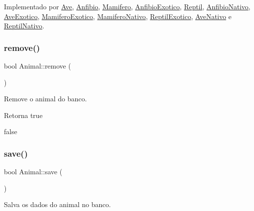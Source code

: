 Implementado por \hyperlink{classAve_a41d6ba4bf7e4823274211a9ae908ff1f}{Ave}, \hyperlink{classAnfibio_a46f3f30c89af05bcdd39abbe692d854f}{Anfibio}, \hyperlink{classMamifero_a88e6c2efe9180611486f82d4dbf308ba}{Mamifero}, \hyperlink{classAnfibioExotico_a08d9debec54258a0f43c8c503dfb23d0}{Anfibio\+Exotico}, \hyperlink{classReptil_af0fc1ff345f15480da9830e38111d181}{Reptil}, \hyperlink{classAnfibioNativo_a7926e1af44542ee268e27dd3d862f583}{Anfibio\+Nativo}, \hyperlink{classAveExotico_a4ba81def12131f047b3800e5f10a983b}{Ave\+Exotico}, \hyperlink{classMamiferoExotico_a4ee6f5f4a2917cfdf54304525add0c4a}{Mamifero\+Exotico}, \hyperlink{classMamiferoNativo_ae2f2b00cb6720cea2780ebef78be52ea}{Mamifero\+Nativo}, \hyperlink{classReptilExotico_a71312f425b92e04d8f29a856abd83f26}{Reptil\+Exotico}, \hyperlink{classAveNativo_ab95679ed20354b2183706db24899d316}{Ave\+Nativo} e \hyperlink{classReptilNativo_ac801a11c87a2847fb4b46488aa6bb789}{Reptil\+Nativo}.

\mbox{\label{classAnimal_a0aea60eaeb4d8f1d68d2c37e279d2d20}} 
\subsubsection{\texorpdfstring{remove()}{remove()}}
{\footnotesize\ttfamily bool Animal\+::remove (\begin{DoxyParamCaption}{ }\end{DoxyParamCaption})}



Remove o animal do banco. 

\begin{DoxyReturn}{Retorna}
true 

false 
\end{DoxyReturn}
\mbox{\label{classAnimal_a0733e9c19d226749195ebe9e64df8964}} 
\subsubsection{\texorpdfstring{save()}{save()}}
{\footnotesize\ttfamily bool Animal\+::save (\begin{DoxyParamCaption}{ }\end{DoxyParamCaption})}



Salva os dados do animal no banco. 

